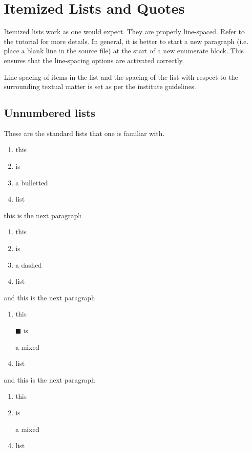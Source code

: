 \chapter{Itemized Lists and Quotes}

Itemized lists work as one would expect. They are properly line-spaced. Refer
to the tutorial for more details. In general, it is better to start a new 
paragraph (i.e. place a blank line in the source file) at the start of a new 
enumerate block. This ensures that the line-spacing options are activated 
correctly.

Line spacing of items in the list and the spacing of the list with respect to
the surrounding textual matter is set as per the institute guidelines.

\section{Unnumbered lists}
These are the standard  lists that one is familiar with.
\begin{enumerate}[blt]
    \item this
    \item is
    \item a bulletted
    \item list
\end{enumerate}

this is the next paragraph

\begin{enumerate}[dmd]
    \item this
    \item is
    \item a dashed
    \item list
\end{enumerate}

and this is the next paragraph

\begin{enumerate}[dsh]
    \item this
    \item[$\blacksquare$] is
    \item[\textbullet] a mixed
    \item list
\end{enumerate}

and this is the next paragraph

\begin{enumerate}[str]
    \item this
    \item is
    \item[\textbullet] a mixed
    \item list
\end{enumerate}

